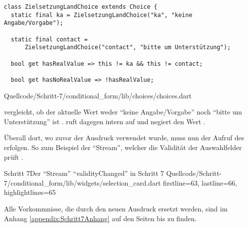 \ifIncludeFigures
  \begin{listing}[htbp]
    \renewcommand\theFancyVerbLine{%
      \ifnum\value{FancyVerbLine}=187
      \setcounter{FancyVerbLine}{197}
      \tiny\ldots
      \else
      \tiny\arabic{FancyVerbLine}%
      \fi
    }
    \begin{verbatim}
class ZielsetzungLandChoice extends Choice {
  static final ka = ZielsetzungLandChoice("ka", "keine Angabe/Vorgabe");

  static final contact =
      ZielsetzungLandChoice("contact", "bitte um Unterstützung");

  bool get hasRealValue => this != ka && this != contact;

  bool get hasNoRealValue => !hasRealValue;
\end{verbatim}
     {Quellcode/Schritt-7/conditional_form/lib/choices/choices.dart}
    \label{lst:Schritt7ZielsetzungLandChoice}
  \end{listing}
\fi


 vergleicht, ob der aktuelle Wert weder \enquote{keine Angabe/Vorgabe} noch \enquote{bitte um Unterstützung} ist .
 ruft dagegen intern  auf und negiert den Wert .


Überall dort, wo zuvor der Ausdruck  verwendet wurde, muss nun der Aufruf des  erfolgen.
So zum Beispiel der \enquote{Stream}, welcher die Validität der Auswahlfelder prüft \Lst{\ref{lst:Schritt7validityChangedchoiceMatcher}}.
\begin{alexlisting}{Schritt 7}{Der \enquote{Stream} \enquote{validityChanged} in Schritt 7}
  {Quellcode/Schritt-7/conditional_form/lib/widgets/selection_card.dart}
  {firstline=63, lastline=66, highlightlines={65}}
  \label{lst:Schritt7validityChangedchoiceMatcher}
  \end{alexlisting}

Alle Vorkommnisse, die durch den neuen Ausdruck ersetzt werden,
sind im Anhang \ref{appendix:Schritt7Anhang} auf den Seiten \pageref{lst:Schritt7validityChangedStreamBuilderChoiceMatcher}
bis \pageref{lst:Schritt7validateChoices} zu finden.

